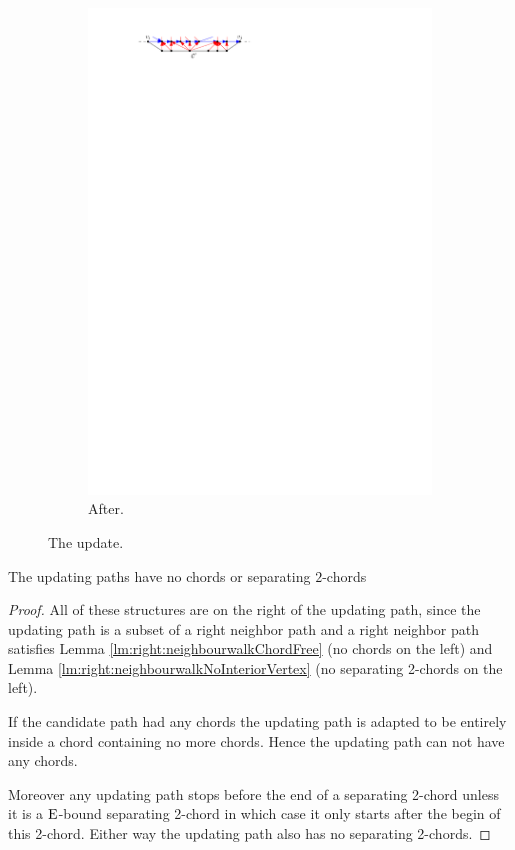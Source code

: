 \begin{figure}
\begin{subfigure}[b]{0.45 \textwidth}
            \includegraphics[width =\textwidth]{unifiedAlgo/img/sweep/updateAfter.pdf}
            \caption{After.}
        \end{subfigure}
        	\caption{The update.}
    \label{fig:sweep:update}
    \end{figure}


    \begin{lemma}
      The updating paths have no chords or separating $2$-chords
      \label{lm:sweep:augNoIregularity}
    \end{lemma}
    \begin{proof}
        All of these structures are on the right of the updating path, since the updating path is a subset of a right neighbor path and a right neighbor path satisfies Lemma \ref{lm:right:neighbourwalkChordFree} (no chords on the left) and Lemma \ref{lm:right:neighbourwalkNoInteriorVertex} (no separating 2-chords on the left).

        If the candidate path had any chords the updating path is adapted to be entirely inside a chord containing no more chords. Hence the updating path can not have any chords.

        Moreover any updating path stops before the end of a separating 2-chord unless it is a $\mathrm{E}$-bound separating 2-chord in which case it only starts after the begin of this 2-chord. Either way the updating path also has no separating 2-chords.
    \end{proof}

